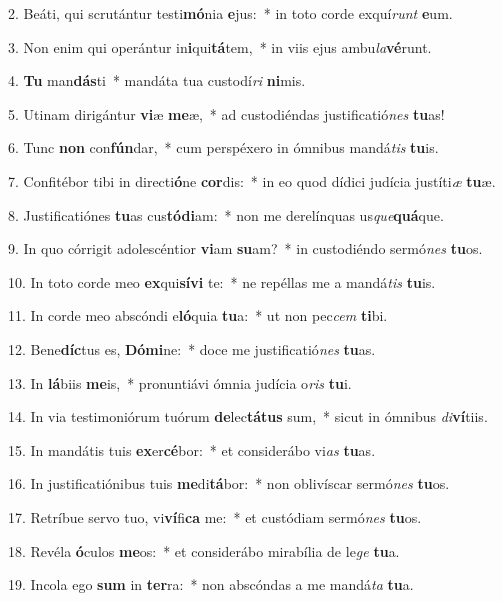 2. Beáti, qui scrutántur testi\textbf{mó}nia \textbf{e}jus:~*  in toto corde exquí\textit{runt} \textbf{e}um.\

3. Non enim qui operántur in\textbf{i}qui\textbf{tá}tem,~*  in viis ejus ambu\textit{la}\textbf{vé}runt.\

4. \textbf{Tu} man\textbf{dás}ti~*  mandáta tua custodí\textit{ri} \textbf{ni}mis.\

5. Utinam dirigántur \textbf{vi}æ \textbf{me}æ,~*  ad custodiéndas justificatió\textit{nes} \textbf{tu}as!\

6. Tunc \textbf{non} con\textbf{fún}dar,~*  cum perspéxero in ómnibus mandá\textit{tis} \textbf{tu}is.\

7. Confitébor tibi in directi\textbf{ó}ne \textbf{cor}dis:~*  in eo quod dídici judícia justíti\textit{æ} \textbf{tu}æ.\

8. Justificatiónes \textbf{tu}as cus\textbf{tó}\textbf{di}am:~*  non me derelínquas us\textit{que}\textbf{quá}que.\

9. In quo córrigit adolescéntior \textbf{vi}am \textbf{su}am?~*  in custodiéndo sermó\textit{nes} \textbf{tu}os.\

10. In toto corde meo \textbf{ex}qui\textbf{sí}\textbf{vi} te:~*  ne repéllas me a mandá\textit{tis} \textbf{tu}is.\

11. In corde meo abscóndi e\textbf{ló}quia \textbf{tu}a:~*  ut non pec\textit{cem} \textbf{ti}bi.\

12. Bene\textbf{díc}tus es, \textbf{Dó}\textbf{mi}ne:~*  doce me justificatió\textit{nes} \textbf{tu}as.\

13. In \textbf{lá}biis \textbf{me}is,~*  pronuntiávi ómnia judícia o\textit{ris} \textbf{tu}i.\

14. In via testimoniórum tuórum \textbf{de}lec\textbf{tá}\textbf{tus} sum,~*  sicut in ómnibus \textit{di}\textbf{ví}tiis.\

15. In mandátis tuis \textbf{ex}er\textbf{cé}bor:~*  et considerábo vi\textit{as} \textbf{tu}as.\

16. In justificatiónibus tuis \textbf{me}di\textbf{tá}bor:~*  non oblivíscar sermó\textit{nes} \textbf{tu}os.\

17. Retríbue servo tuo, vi\textbf{ví}fi\textbf{ca} me:~*  et custódiam sermó\textit{nes} \textbf{tu}os.\

18. Revéla \textbf{ó}culos \textbf{me}os:~*  et considerábo mirabília de le\textit{ge} \textbf{tu}a.\

19. Incola ego \textbf{sum} in \textbf{ter}ra:~*  non abscóndas a me mandá\textit{ta} \textbf{tu}a.\

